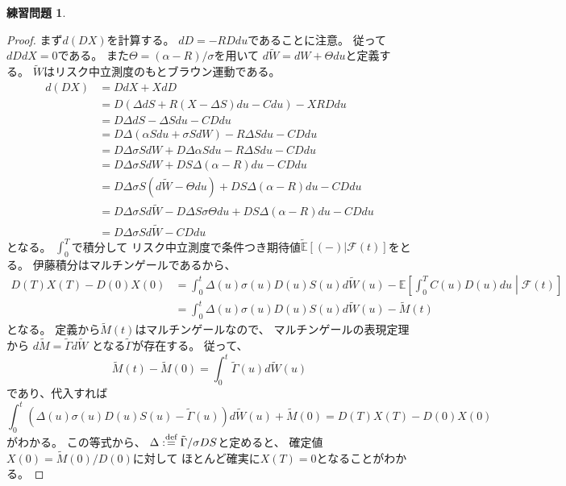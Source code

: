\documentclass[uplatex]{jsarticle}
\theoremstyle{definition}
\newtheorem{prob}[prob]{練習問題}
\def\E{\mathbb{E}}
\def\mcF{\mathcal{F}}
\def\dfn{:\overset{\mbox{{\scriptsize def}}}{=}}
\begin{document}
\begin{prob}\label{prob: 5.11}

\end{prob}


\begin{proof}
  まず\(d(DX)\)を計算する。
  \(dD = -RDdu\)であることに注意。
  従って\(dDdX=0\)である。
  また\(\Theta =(\alpha-R)/\sigma\)を用いて
  \(d\tilde{W} = dW + \Theta du\)と定義する。
  \(\tilde{W}\)はリスク中立測度のもとブラウン運動である。
  \begin{align*}
    d(DX) &= DdX + XdD \\
    &= D\left( \Delta dS + R(X-\Delta S)du - Cdu \right) - XRDdu \\
    &= D\Delta dS - \Delta Sdu - CDdu \\
    &= D\Delta (\alpha Sdu + \sigma SdW) - R\Delta Sdu - CDdu \\
    &= D\Delta\sigma SdW + D\Delta \alpha Sdu - R\Delta Sdu - CDdu \\
    &= D\Delta\sigma SdW + DS\Delta (\alpha - R)du - CDdu \\
    &= D\Delta\sigma S(d\tilde{W} - \Theta du)
    + DS\Delta (\alpha - R)du - CDdu \\
    &= D\Delta\sigma Sd\tilde{W} - D\Delta S\sigma \Theta du
    + DS\Delta (\alpha - R)du - CDdu \\
    &= D\Delta\sigma Sd\tilde{W} - CDdu
  \end{align*}
  となる。
  \(\int_0^T\)で積分して
  リスク中立測度で条件つき期待値\(\tilde{\E}[(-)|\mcF(t)]\)をとる。
  伊藤積分はマルチンゲールであるから、
  \begin{align*}
    D(T)X(T) - D(0)X(0)
    &= \int_0^t\Delta(u)\sigma(u) D(u)S(u)d\tilde{W}(u)
    - \E \left[ \int_0^TC(u)D(u)du \middle| \mcF(t)\right] \\
    &= \int_0^t\Delta(u)\sigma(u) D(u)S(u)d\tilde{W}(u) - \tilde{M}(t)
  \end{align*}
  となる。
  定義から\(\tilde{M}(t)\)はマルチンゲールなので、
  マルチンゲールの表現定理から
  \(d\tilde{M} = \tilde{\Gamma}d\tilde{W}\)
  となる\(\tilde{\Gamma}\)が存在する。
  従って、
  \[
  \tilde{M}(t) - \tilde{M}(0) = \int_0^t\tilde{\Gamma}(u)d\tilde{W}(u)
  \]
  であり、代入すれば
  \[
  \int_0^t\left(\Delta(u)\sigma(u) D(u)S(u)
  - \tilde{\Gamma}(u) \right)d\tilde{W}(u)
  + \tilde{M}(0)
  = D(T)X(T) - D(0)X(0)
  \]
  がわかる。
  この等式から、
  \(\Delta \dfn \tilde{\Gamma} / \sigma DS\)と定めると、
  確定値\(X(0) = \tilde{M}(0) / D(0)\)に対して
  ほとんど確実に\(X(T)=0\)となることがわかる。
\end{proof}
\end{document}
